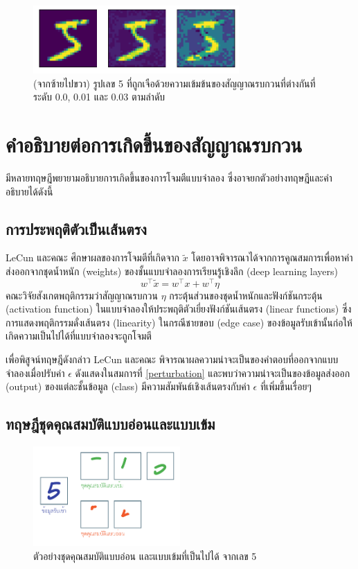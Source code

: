 \documentclass{cpereport}
\begin{document}
\begin{figure}
    \centering
    \includegraphics[width=0.7\textwidth]{images/density.pdf}
    \caption{(จากซ้ายไปขวา) รูปเลข 5 ที่ถูกเจือด้วยความเข้มข้นของสัญญาณรบกวนที่ต่างกันที่ระดับ 0.0,  0.01 และ 0.03 ตามลำดับ}
    \label{perturbation-density}
\end{figure}

\section{คำอธิบายต่อการเกิดขึ้นของสัญญาณรบกวน}

มีหลายทฤษฎีพยายามอธิบายการเกิดขึ้นของการโจมตีแบบจำลอง ซึ่งอาจยกตัวอย่างทฤษฎีและคำอธิบายได้ดังนี้

\subsection{การประพฤติตัวเป็นเส้นตรง}
LeCun และคณะ \cite{1412.6572} ศึกษาผลของการโจมตีที่เกิดจาก $\tilde{x}$ โดยอาจพิจารณาได้จากการคูณสมการเพื่อหาค่าส่งออกจากชุดน้ำหนัก (weights) ของชั้นแบบจำลองการเรียนรู้เชิงลึก (deep learning layers) 
\begin{equation}
    w^\top\tilde{x} = w^\top x + w^\top \eta
\end{equation}
คณะวิจัยสังเกตพฤติกรรมว่าสัญญาณรบกวน $\eta$ กระตุ้นส่วนของชุดน้ำหนักและฟังก์ชันกระตุ้น (activation function) ในแบบจำลองให้ประพฤติตัวเยี่ยงฟังก์ชันเส้นตรง (linear functions) ซึ่งการแสดงพฤติกรรมดั่งเส้นตรง (linearity) ในกรณีชายขอบ (edge case) ของข้อมูลรับเข้านั้นก่อให้เกิดความเป็นไปได้ที่แบบจำลองจะถูกโจมตี

เพื่อพิสูจน์ทฤษฎีดังกล่าว LeCun และคณะ พิจารณาผลความน่าจะเป็นของคำตอบที่ออกจากแบบจำลองเมื่อปรับค่า $\epsilon$ ดังแสดงในสมการที่ \ref{perturbation} และพบว่าความน่าจะเป็นของข้อมูลส่งออก (output) ของแต่ละชั้นข้อมูล (class) มีความสัมพันธ์เชิงเส้นตรงกับค่า $\epsilon$ ที่เพิ่มขึ้นเรื่อยๆ

\subsection{ทฤษฎีชุดคุณสมบัติแบบอ่อนและแบบเข้ม}

\begin{figure}
    \centering
    \includegraphics[width=0.5\textwidth]{images/strong-weak-features.pdf}
    \caption{ตัวอย่างชุดคุณสมบัติแบบอ่อน และแบบเข้มที่เป็นไปได้ จากเลข 5}
    \label{5-weak-strong}
\end{figure}
\end{document}
